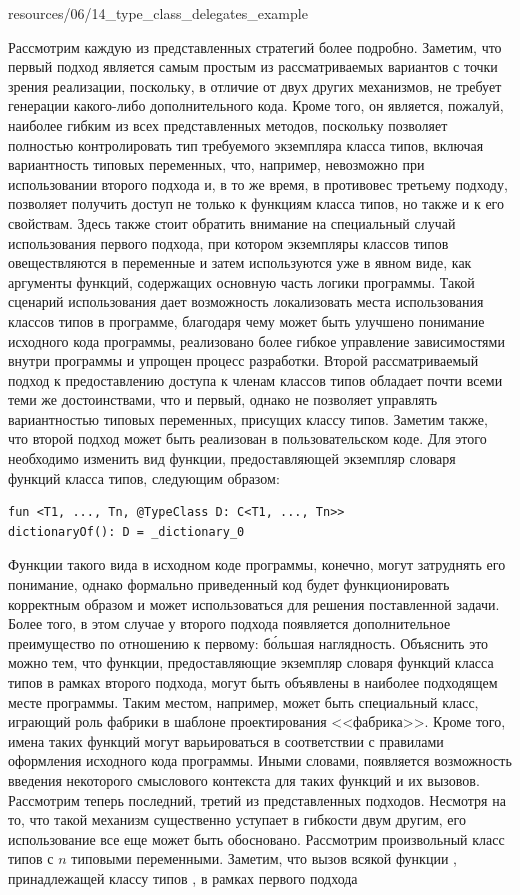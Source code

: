 
{resources/06/14_type_class_delegates_example}

Рассмотрим каждую из представленных стратегий более подробно. Заметим, что первый подход является самым простым из рассматриваемых вариантов с точки зрения реализации, поскольку, в отличие от двух других механизмов, не требует генерации какого-либо дополнительного кода. Кроме того, он является, пожалуй, наиболее гибким из всех представленных методов, поскольку позволяет полностью контролировать тип требуемого экземпляра класса типов, включая вариантность типовых переменных, что, например, невозможно при использовании второго подхода и, в то же время, в противовес третьему подходу, позволяет получить доступ не только к функциям класса типов, но также и к его свойствам. Здесь также стоит обратить внимание на специальный случай использования первого подхода, при котором экземпляры классов типов овеществляются в переменные и затем используются уже в явном виде, как аргументы функций, содержащих основную часть логики программы.  Такой сценарий использования дает возможность локализовать места использования классов типов в программе, благодаря чему может быть улучшено понимание исходного кода программы, реализовано более гибкое управление зависимостями внутри программы и упрощен процесс разработки. Второй рассматриваемый подход к предоставлению доступа к членам классов типов обладает почти всеми теми же достоинствами, что и первый, однако не позволяет управлять вариантностью типовых переменных, присущих классу типов. Заметим также, что второй подход может быть реализован в пользовательском коде. Для этого необходимо изменить вид функции, предоставляющей экземпляр словаря функций класса типов, следующим образом:
\begin{lstlisting}[style={wo_caption}]
fun <T1, ..., Tn, @TypeClass D: C<T1, ..., Tn>> 
dictionaryOf(): D = _dictionary_0
\end{lstlisting}
Функции такого вида в исходном коде программы, конечно, могут затруднять его понимание, однако формально приведенный код будет функционировать корректным образом и может использоваться для решения поставленной задачи. Более того, в этом случае у второго подхода появляется дополнительное преимущество по отношению к первому: б\'{о}льшая наглядность. Объяснить это можно тем, что функции, предоставляющие экземпляр словаря функций класса типов в рамках второго подхода, могут быть объявлены в наиболее подходящем месте программы. Таким местом, например, может быть специальный класс, играющий роль фабрики в шаблоне проектирования <<фабрика>>. Кроме того, имена таких функций могут варьироваться в соответствии с правилами оформления исходного кода программы. Иными словами, появляется возможность введения некоторого смыслового контекста для таких функций и их вызовов. Рассмотрим теперь последний, третий из представленных подходов. Несмотря на то, что такой механизм существенно уступает в гибкости двум другим, его использование все еще может быть обосновано. Рассмотрим произвольный класс типов  с $n$ типовыми переменными. Заметим, что вызов всякой функции , принадлежащей классу типов , в рамках первого подхода
